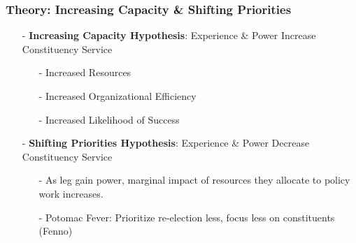 \documentclass[xcolor=dvipsnames]{beamer}
\begin{document}
\begin{frame}
\frametitle{Theory: Increasing Capacity \& Shifting Priorities}
\begin{itemize}
\item[-] \textbf{Increasing Capacity Hypothesis}: Experience \& Power Increase Constituency Service
\begin{itemize}
\item[-] Increased Resources
\item[-] Increased Organizational Efficiency
\item[-] Increased Likelihood of Success
\end{itemize}
\pause
\item[-] \textbf{Shifting Priorities Hypothesis}: Experience \& Power Decrease Constituency Service
\begin{itemize}
\item[-] As leg gain power, marginal impact of resources they allocate to policy work increases. 
\item[-] Potomac Fever: Prioritize re-election less, focus less on constituents (Fenno)
\end{itemize}
\end{itemize}

\end{frame}
\end{document}
